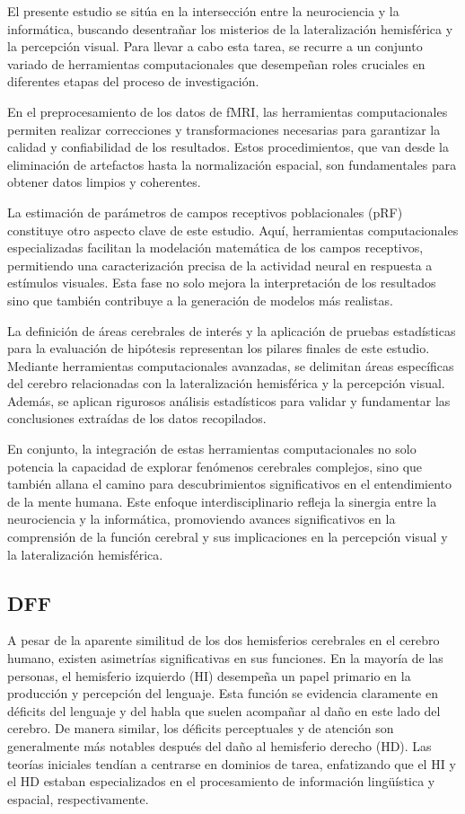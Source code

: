 \documentclass{article}
\begin{document}
	El presente estudio se sitúa en la intersección entre la neurociencia y la informática, buscando desentrañar los misterios de la lateralización hemisférica y la percepción visual. Para llevar a cabo esta tarea, se recurre a un conjunto variado de herramientas computacionales que desempeñan roles cruciales en diferentes etapas del proceso de investigación.
	
	En el preprocesamiento de los datos de fMRI, las herramientas computacionales permiten realizar correcciones y transformaciones necesarias para garantizar la calidad y confiabilidad de los resultados. Estos procedimientos, que van desde la eliminación de artefactos hasta la normalización espacial, son fundamentales para obtener datos limpios y coherentes.
	
	La estimación de parámetros de campos receptivos poblacionales (pRF) constituye otro aspecto clave de este estudio. Aquí, herramientas computacionales especializadas facilitan la modelación matemática de los campos receptivos, permitiendo una caracterización precisa de la actividad neural en respuesta a estímulos visuales. Esta fase no solo mejora la interpretación de los resultados sino que también contribuye a la generación de modelos más realistas.
	
	La definición de áreas cerebrales de interés y la aplicación de pruebas estadísticas para la evaluación de hipótesis representan los pilares finales de este estudio. Mediante herramientas computacionales avanzadas, se delimitan áreas específicas del cerebro relacionadas con la lateralización hemisférica y la percepción visual. Además, se aplican rigurosos análisis estadísticos para validar y fundamentar las conclusiones extraídas de los datos recopilados.
	
	En conjunto, la integración de estas herramientas computacionales no solo potencia la capacidad de explorar fenómenos cerebrales complejos, sino que también allana el camino para descubrimientos significativos en el entendimiento de la mente humana. Este enfoque interdisciplinario refleja la sinergia entre la neurociencia y la informática, promoviendo avances significativos en la comprensión de la función cerebral y sus implicaciones en la percepción visual y la lateralización hemisférica.
	
	\subsection{DFF}
	
	A pesar de la aparente similitud de los dos hemisferios cerebrales en el cerebro humano, existen asimetrías significativas en sus funciones. En la mayoría de las personas, el hemisferio izquierdo (HI) desempeña un papel primario en la producción y percepción del lenguaje. Esta función se evidencia claramente en déficits del lenguaje y del habla que suelen acompañar al daño en este lado del cerebro. De manera similar, los déficits perceptuales y de atención son generalmente más notables después del daño al hemisferio derecho (HD). Las teorías iniciales tendían a centrarse en dominios de tarea, enfatizando que el HI y el HD estaban especializados en el procesamiento de información lingüística y espacial, respectivamente.
	
\end{document}
